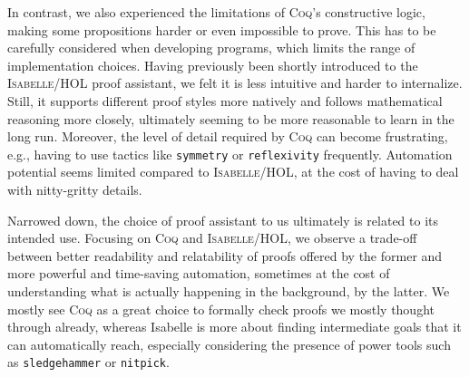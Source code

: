 In contrast, we also experienced the limitations of \textsc{Coq}'s constructive logic, making some propositions harder or even impossible to prove.
This has to be carefully considered when developing programs, which limits the range of implementation choices.
Having previously been shortly introduced to the \textsc{Isabelle/HOL} proof assistant, we felt it is less intuitive and harder to internalize. 
Still, it supports different proof styles more natively and follows mathematical reasoning more closely, ultimately seeming to be more reasonable to learn in the long run.
Moreover, the level of detail required by \textsc{Coq} can become frustrating, e.g., having to use tactics like \texttt{symmetry} or \texttt{reflexivity} frequently.
Automation potential seems limited compared to \textsc{Isabelle/HOL}, at the cost of having to deal with nitty-gritty details.

Narrowed down, the choice of proof assistant to us ultimately is related to its intended use.
Focusing on \textsc{Coq} and \textsc{Isabelle/HOL}, we observe a trade-off between better readability and relatability of proofs offered by the former and more powerful and time-saving automation, sometimes at the cost of understanding what is actually happening in the background, by the latter.
We mostly see \textsc{Coq} as a great choice to formally check proofs we mostly thought through already, whereas Isabelle is more about finding intermediate goals that it can automatically reach, especially considering the presence of power tools such as \texttt{sledgehammer} or \texttt{nitpick}.



